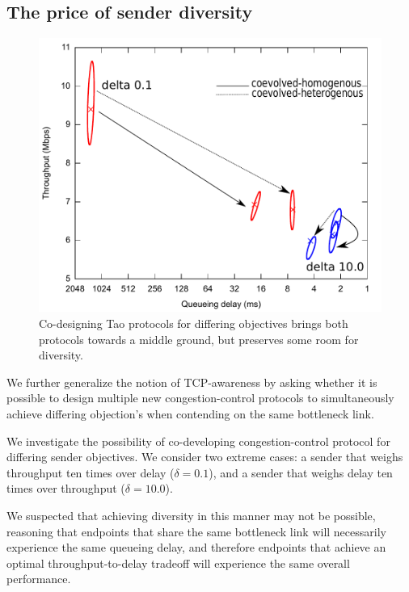 \label{ss:backward}

\subsection{The price of sender diversity}
\label{ss:forward}

\begin{figure}
\centering
\includegraphics[width=\columnwidth]{diversity-both.pdf}
\caption{Co-designing Tao protocols for differing objectives brings both protocols towards a middle ground, but preserves some room for diversity.}
\label{fig:diversity-training}
\end{figure}

We further generalize the notion of TCP-awareness by asking whether it
is possible to design multiple new congestion-control protocols to
simultaneously achieve differing objection's when contending on the
same bottleneck link.

We investigate the possibility of co-developing congestion-control protocol
for differing sender objectives. We consider two extreme cases: a sender
that weighs throughput ten times over delay ($\delta=0.1$), and a sender that
weighs delay ten times over throughput ($\delta=10.0$).

We suspected that achieving diversity in this manner may not be
possible, reasoning that endpoints that share the same bottleneck link
will necessarily experience the same queueing delay, and therefore
endpoints that achieve an optimal throughput-to-delay tradeoff will
experience the same overall performance.

